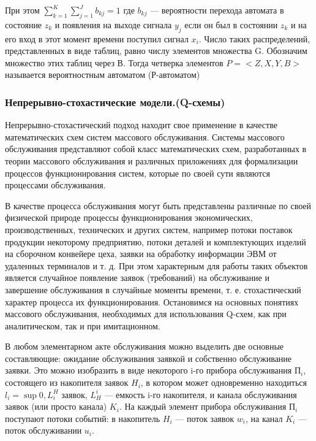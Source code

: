   При этом $\sum_{k=1}^{K}\sum_{j=1}^{J} b_{kj} = 1$ где  $b_{kj}$ — вероятности перехода автомата в состояние $z_{k}$ и появления на выходе сигнала $y_{j}$ если он был в состоянии $z_{k}$ и на его вход в этот момент времени поступил сигнал $x_{i}$. Число таких распределений, представленных в виде таблиц, равно числу элементов множества G. Обозначим множество этих таблиц через В. Тогда четверка элементов $P = <Z, X, Y, B>$ называется вероятностным автоматом (Р-автоматом)

\subsubsection{Непрерывно-стохастические модели.(Q-схемы)}

  Непрерывно-стохастический подход находит свое применение в качестве математических схем систем массового обслуживания. Системы массового обслуживания представляют собой класс математических схем, разработанных в теории массового обслуживания и различных приложениях для формализации процессов функционирования систем, которые по своей сути являются процессами обслуживания.

  В качестве процесса обслуживания могут быть представлены различные по своей физической природе процессы функционирования экономических, производственных, технических и других систем, например потоки поставок продукции некоторому предприятию, потоки деталей и комплектующих изделий на сборочном конвейере цеха, заявки на обработку информации ЭВМ от удаленных терминалов и т. д. При этом характерным для работы таких объектов является случайное появление заявок (требований) на обслуживание и завершение обслуживания в случайные моменты времени, т. е. стохастический характер процесса их функционирования. Остановимся на основных понятиях массового обслуживания, необходимых для использования Q-схем, как при аналитическом, так и при имитационном.

  В любом элементарном акте обслуживания можно выделить две основные составляющие: ожидание обслуживания заявкой и собственно обслуживание заявки. Это можно изобразить в виде некоторого i-го прибора обслуживания $\text{П}_{i}$, состоящего из накопителя заявок $H_{i}$, в котором может одновременно находиться $l_{i} = \sup{0, L^{H}_{i}}$ заявок, $L^{i}_{H}$  — емкость i-го накопителя, и канала обслуживания заявок (или просто канала) $K_{i}$. На каждый элемент прибора обслуживания $П_{i}$ поступают потоки событий: в накопитель $H_{i}$ — поток заявок $w_{i}$, на канал $K_{i}$ — поток обслуживании $u_{i}$.

